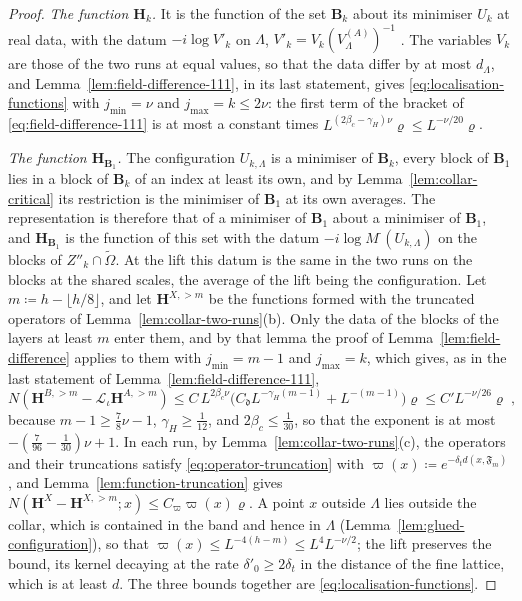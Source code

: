 \begin{proof}
\emph{The function $\mathbf H_k$.} It is the function \cite[(179), (180)]{BalabanVAR} of the set $\mathbf B_k$ about its minimiser $U_k$ at real data, with the datum $-i\log V'_k$ on $\Lambda$, $V'_k = V_k(V^{(A)}_\Lambda)^{-1}$ \cite[(1.58), (1.64)]{BalabanLFR2}. The variables $V_k$ are those of the two runs at equal values, so that the data differ by at most $d_\Lambda$, and Lemma~\ref{lem:field-difference-111}, in its last statement, gives \eqref{eq:localisation-functions} with $j_{\min} = \nu$ and $j_{\max} = k \leq 2\nu$: the first term of the bracket of \eqref{eq:field-difference-111} is at most a constant times $L^{(2\beta_c - \gamma_H)\nu}\varrho \leq L^{-\nu/20}\varrho$.

\emph{The function $\mathbf H_{\mathbf B_1}$.} The configuration $U_{k,\Lambda}$ is a minimiser of $\mathbf B_k$, every block of $\mathbf B_1$ lies in a block of $\mathbf B_k$ of an index at least its own, and by Lemma~\ref{lem:collar-critical} its restriction is the minimiser of $\mathbf B_1$ at its own averages. The representation \cite[(1.57)]{BalabanLFR2} is therefore that of a minimiser of $\mathbf B_1$ about a minimiser of $\mathbf B_1$, and $\mathbf H_{\mathbf B_1}$ is the function \cite[(179), (180)]{BalabanVAR} of this set with the datum $-i\log M^\cdot(U_{k,\Lambda})$ on the blocks of $Z''_k \cap \tilde\Omega$. At the lift this datum is the same in the two runs on the blocks at the shared scales, the average of the lift being the configuration. Let $m \coloneqq h - \lfloor h/8\rfloor$, and let $\mathbf H^{X,>m}$ be the functions formed with the truncated operators of Lemma~\ref{lem:collar-two-runs}(b). Only the data of the blocks of the layers at least $m$ enter them, and by that lemma the proof of Lemma~\ref{lem:field-difference} applies to them with $j_{\min} = m - 1$ and $j_{\max} = k$, which gives, as in the last statement of Lemma~\ref{lem:field-difference-111},
\[
    N(\mathbf H^{B,>m} - \mathcal L_\iota\mathbf H^{A,>m}) \leq C\,L^{2\beta_c\nu}\bigl(C_{\mathfrak d}L^{-\gamma_H(m-1)} + L^{-(m-1)}\bigr)\varrho \leq C'L^{-\nu/26}\varrho\;,
\]
because $m - 1 \geq \frac{7}{8}\nu - 1$, $\gamma_H \geq \frac{1}{12}$, and $2\beta_c \leq \frac{1}{30}$, so that the exponent is at most $-(\frac{7}{96} - \frac{1}{30})\nu + 1$. In each run, by Lemma~\ref{lem:collar-two-runs}(c), the operators and their truncations satisfy \eqref{eq:operator-truncation} with $\varpi(x) \coloneqq e^{-\delta_td(x,\mathfrak F_m)}$, and Lemma~\ref{lem:function-truncation} gives $N(\mathbf H^X - \mathbf H^{X,>m}; x) \leq C_\varpi\varpi(x)\varrho$. A point $x$ outside $\Lambda$ lies outside the collar, which is contained in the band and hence in $\Lambda$ (Lemma~\ref{lem:glued-configuration}), so that $\varpi(x) \leq L^{-4(h-m)} \leq L^4L^{-\nu/2}$; the lift preserves the bound, its kernel decaying at the rate $\delta'_0 \geq 2\delta_t$ in the distance of the fine lattice, which is at least $d$. The three bounds together are \eqref{eq:localisation-functions}.


\end{proof}
